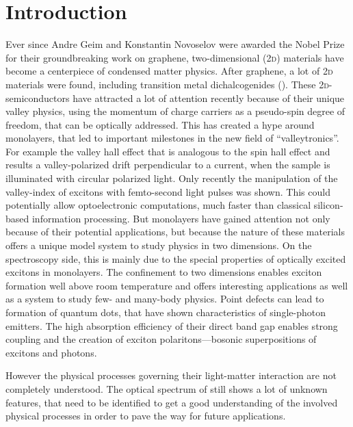 \chapter{Introduction}
Ever since Andre Geim and Konstantin Novoselov were awarded the Nobel Prize for their groundbreaking work on graphene, two-dimensional (2\textsc{d}) materials have become a centerpiece of condensed matter physics\cite{novoselov_electric_2004}. After graphene, a lot of 2\textsc{d} materials were found, including transition metal dichalcogenides (\tmds\!). These 2\textsc{d}-semiconductors have attracted a lot of attention recently because of their unique valley physics, using the momentum of charge carriers as a pseudo-spin degree of freedom, that can be optically addressed\cite{wang_electronics_2012}. This has created a hype around \tmdg monolayers, that led to important milestones in the new field of ``valleytronics''. For example the valley hall effect\cite{mak_valley_2014} that is analogous to the spin hall effect and results a valley-polarized drift perpendicular to a current, when the sample is illuminated with circular polarized light. Only recently the manipulation of the valley-index of excitons with femto-second light pulses was shown\cite{langer_lightwave_2018}. This could potentially allow optoelectronic computations, much faster than classical silicon-based information processing. But \tmdg monolayers have gained attention not only because of their potential applications, but because the nature of these materials offers a unique model system to study physics in two dimensions. On the spectroscopy side, this is mainly due to the special properties of optically excited excitons in \tmdg monolayers. The confinement to two dimensions enables exciton formation well above room temperature and offers interesting applications as well as a system to study few- and many-body physics\cite{chernikov_exciton_2014}. Point defects can lead to formation of quantum dots, that have shown characteristics of single-photon emitters\cite{srivastava_optically_2015}. The high absorption efficiency of their direct band gap enables strong coupling and the creation of exciton polaritons---bosonic superpositions of excitons and photons\cite{liu_control_2017,zhang_photonic-crystal_2018}.

However the physical processes governing their light-matter interaction are not completely understood\cite{koperski_optical_2017}. The optical spectrum of \tmds still shows a lot of unknown features, that need to be identified to get a good understanding of the involved physical processes in order to pave the way for future applications. 

